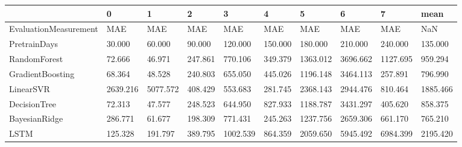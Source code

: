 \begin{tabular}{llllllllll}
\toprule
{} &        0 &        1 &       2 &        3 &       4 &        5 &        6 &        7 &     mean \\
\midrule
EvaluationMeasurement &      MAE &      MAE &     MAE &      MAE &     MAE &      MAE &      MAE &      MAE &      NaN \\
PretrainDays          &   30.000 &   60.000 &  90.000 &  120.000 & 150.000 &  180.000 &  210.000 &  240.000 &  135.000 \\
RandomForest          &   72.666 &   46.971 & 247.861 &  770.106 & 349.379 & 1363.012 & 3696.662 & 1127.695 &  959.294 \\
GradientBoosting      &   68.364 &   48.528 & 240.803 &  655.050 & 445.026 & 1196.148 & 3464.113 &  257.891 &  796.990 \\
LinearSVR             & 2639.216 & 5077.572 & 408.429 &  553.683 & 281.745 & 2368.143 & 2944.476 &  810.464 & 1885.466 \\
DecisionTree          &   72.313 &   47.577 & 248.523 &  644.950 & 827.933 & 1188.787 & 3431.297 &  405.620 &  858.375 \\
BayesianRidge         &  286.771 &   61.677 & 198.309 &  771.431 & 245.263 & 1237.756 & 2659.306 &  661.170 &  765.210 \\
LSTM                  &  125.328 &  191.797 & 389.795 & 1002.539 & 864.359 & 2059.650 & 5945.492 & 6984.399 & 2195.420 \\
\bottomrule
\end{tabular}
